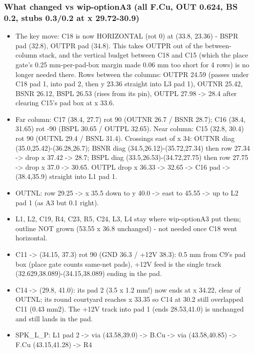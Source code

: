 \documentclass[11pt]{article}
\begin{document}
\subsubsection*{What changed vs wip-optionA3 (all F.Cu, OUT 0.624, BS 0.2, stubs 0.3/0.2 at x 29.72-30.9)}
\begin{itemize}
\item The key move: C18 is now HORIZONTAL (rot 0) at (33.8, 23.36) - BSPR pad (32.8), OUTPR pad (34.8).
This takes OUTPR out of the between-column stack, and the vertical budget between C18 and C15
(which the place gate's 0.25 mm-per-pad-box margin made 0.06 mm too short for 4 rows) is no longer
needed there. Rows between the columns: OUTPR 24.59 (passes under C18 pad 1, into pad 2, then
y 23.36 straight into L3 pad 1), OUTNR 25.42, BSNR 26.12, BSPL 26.53 (rises from its pin), OUTPL
27.98 -\textgreater{} 28.4 after clearing C15's pad box at x 33.6.
\item Far column: C17 (38.4, 27.7) rot 90 (OUTNR 26.7 / BSNR 28.7); C16 (38.4, 31.65) rot -90 (BSPL
30.65 / OUTPL 32.65). Near column: C15 (32.8, 30.4) rot 90 (OUTNL 29.4 / BSNL 31.4).
Crossings east of x 34: OUTNR diag (35.0,25.42)-(36.28,26.7); BSNR diag (34.5,26.12)-(35.72,27.34)
then row 27.34 -\textgreater{} drop x 37.42 -\textgreater{} 28.7; BSPL diag (33.5,26.53)-(34.72,27.75) then row 27.75 -\textgreater{}
drop x 37.0 -\textgreater{} 30.65. OUTPL drop x 36.33 -\textgreater{} 32.65 -\textgreater{} C16 pad -\textgreater{} (38.4,35.9) straight into L1 pad 1.
\item OUTNL: row 29.25 -\textgreater{} x 35.5 down to y 40.0 -\textgreater{} east to 45.55 -\textgreater{} up to L2 pad 1 (as A3 but 0.1 right).
\item L1, L2, C19, R4, C23, R5, C24, L3, L4 stay where wip-optionA3 put them; outline NOT grown
(53.55 x 36.8 unchanged) - not needed once C18 went horizontal.
\item C11 -\textgreater{} (34.15, 37.3) rot 90 (GND 36.3 / +12V 38.3): 0.5 mm from C9's pad box (place gate counts
same-net pads), +12V feed is the single track (32.629,38.089)-(34.15,38.089) ending in the pad.
\item C14 -\textgreater{} (29.8, 41.0): its pad 2 (3.5 x 1.2 mm!) now ends at x 34.22, clear of OUTNL; its round
courtyard reaches x 33.35 so C14 at 30.2 still overlapped C11 (0.43 mm2). The +12V track into
pad 1 (ends 28.53,41.0) is unchanged and still lands in the pad.
\item SPK\_L\_P: L1 pad 2 -\textgreater{} via (43.58,39.0) -\textgreater{} B.Cu -\textgreater{} via (43.58,40.85) -\textgreater{} F.Cu (43.15,41.28) -\textgreater{} R4

\end{itemize}
\end{document}
